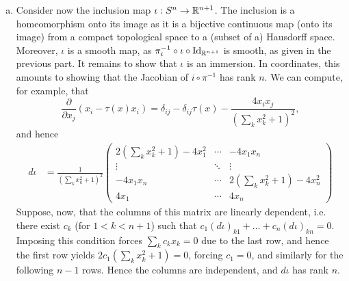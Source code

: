 \documentclass{../mathnotes}
\begin{document}
\begin{enumerate}[(a)]
    \item Consider now the inclusion map $\iota:S^n\to\mathbb{R}^{n+1}$. The inclusion is a homeomorphism onto
        its image as it is a bijective continuous map (onto its image) from a compact topological
        space to a (subset of a) Hausdorff space. Moreover, $\iota$ is a smooth map, as
        $\pi_i^{-1}\circ\iota\circ\operatorname{Id}_{\mathbb{R}^{n+1}}$ is smooth, as given in the previous part.
        It remains to show that $\iota$ is an immersion. In coordinates, this amounts to showing that
        the Jacobian of $i\circ\pi^{-1}$ has rank $n$. We can compute, for example, that
        \[\frac{\partial}{\partial x_j}(x_i-\tau(x)x_i)=\delta_{ij}-\delta_{ij}\tau(x)-\frac{4x_ix_j}{(\sum_k x_k^2+1)^2},\]
        and hence
        \begin{align*}
            d\iota &=
            \frac{1}{(\sum_kx_k^2+1)^2}
            \begin{pmatrix}
                2(\sum_kx_k^2+1)-4x_1^2 & \cdots & - 4x_1x_n\\
                \vdots & \ddots & \vdots\\
                -4x_1x_n & \cdots & 2(\sum_k x_k^2+1)-4x_n^2\\
                4x_1 & \cdots & 4x_n
            \end{pmatrix}
        \end{align*}
        Suppose, now, that the columns of this matrix are linearly dependent, i.e. there exist $c_k$ (for $1<k<n+1$)
        such that $c_1(d\iota)_{k1}+\ldots+c_n(d\iota)_{kn}=0$. Imposing this condition forces $\sum_kc_kx_k=0$
        due to the last row, and hence the first row yields $2c_1(\sum_kx_k^2+1)=0$, forcing $c_1=0$, and similarly
        for the following $n-1$ rows. Hence the columns are independent, and $d\iota$ has rank $n$.
\end{enumerate}
\end{document}
